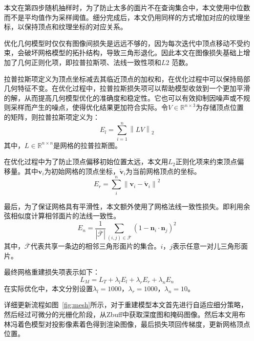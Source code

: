 本文在第四步随机抽样时，为了防止太多的面片不在查询集合中，本文使用中位数而不是平均值作为采样阈值。细分完成后，本文仍用同样的方式增加对应的纹理坐标，以保持顶点和纹理坐标的对应关系。\par
优化几何模型时仅仅有图像间损失是远远不够的，因为每次迭代中顶点移动不受约束，会破坏网格模型的拓扑结构，导致三角形退化。因此本文在图像损失基础上增加了几何正则化项，即拉普拉斯项、法线一致性项和$L2$ 范数。\par
拉普拉斯项定义为顶点坐标减去其临近顶点的加权和，在优化过程中可以保持局部几何特征不变。在优化过程中，拉普拉斯损失项可以帮助模型收敛到一个更加平滑的解，从而提高几何模型优化的准确度和稳定性。它也可以有效抑制因噪声或不规则采样而产生的噪点，使得优化结果更加符合实际。令$V \in \mathbb{R}^{n\times3}$为存储顶点位置的矩阵，则拉普拉斯项定义为：
\begin{equation}
	E_l = \sum_{i=1}^{n}\left \| LV \right \|_2 
\end{equation}
其中，$L\in\mathbb{R}^{n\times n} $是网格的拉普拉斯图。\par
在优化过程中为了防止顶点偏移初始位置太远，本文用$L_2$正则化项来约束顶点偏移量。其中$\mathbf{v}_{i}$为初始网格的顶点坐标，$\widetilde{\mathbf{v}}_{i}$为当前网格顶点的坐标。
\begin{equation}
	E_{r}=\sum_{i}^{n}\left\|\mathbf{v}_{i}-\widetilde{\mathbf{v}}_{i}\right\|^{2}
\end{equation}

最后，为了保证网格具有平滑性，本文额外使用了网格法线一致性损失。即利用余弦相似度计算相邻面片的法线一致性。
\begin{equation}
	E_n= \frac{1}{|\overline{\mathcal{F}}|} \sum_{(i, j) \in \overline{\mathcal{F}}}\left(1-\mathbf{n}_{i} \cdot \mathbf{n}_{j}\right)^{2}
\end{equation}
其中，$\overline{\mathcal{F}}$代表共享一条边的相邻三角形面片的集合。$i$，$j$表示任意一对儿三角形面片。\par
最终网格重建损失项表示如下：
\begin{equation}
	L_M = L_T + \lambda_l E_l +\lambda_r E_r+\lambda_n E_n
\end{equation}
在实际优化中，本文分别设置$\lambda_l = 1000$，$\lambda_r = 1000$，$\lambda_n = 10$。\par

详细更新流程如图~\ref{fig:mesh}所示，对于重建模型本文首先进行自适应细分策略，然后经过可微分的光栅化阶段，从Zbuff中获取深度图和掩码图像。然后本文用布林冯着色模型对投影像素着色得到渲染图像，最后损失项回传梯度，更新网格顶点位置。


